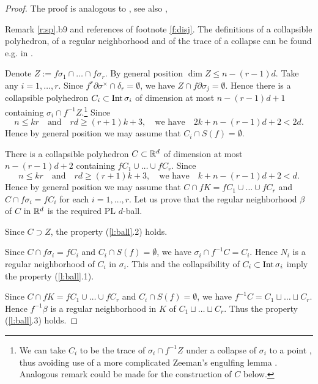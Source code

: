 \documentclass[12pt]{article}
\newcommand{\jonly}[1]{}
\newcommand{\aronly}[1]{#1}
\def\diag{\delta}
\def\Int{\mathop{\fam0 Int}}
\theoremstyle{plain}
\theoremstyle{definition}
\begin{document}
\begin{proof}
The proof is analogous to \cite[\S5]{We67}, see also \cite[Lemma 8]{MW16},
\jonly{\cite[Remark 6.1.b9]{Sk17} and references of \cite[footnote 6]{Sk17}.}
\aronly{Remark \ref{r:sp}.b9 and references of footnote \ref{f:disj}.}
The definitions of a collapsible polyhedron, of a regular neighborhood and of the trace of a collapse can be found e.g. in \cite[\S8.3]{Sk06}.

Denote $Z:=f\sigma_1\cap\ldots\cap f\sigma_r$.
By general position $\dim Z\le n-(r-1)d$.
Take any $i=1,\ldots,r$.
Since $f^r\partial\sigma^\times\cap\diag_r=\emptyset$, we have $Z\cap f\partial\sigma_j=\emptyset$.
Hence there is a collapsible polyhedron $C_i\subset\Int\sigma_i$ of dimension at most $n-(r-1)d+1$ containing $\sigma_i\cap f^{-1}Z$.\aronly{\footnote{We can take $C_i$ to be the trace of $\sigma_i\cap f^{-1}Z$ under a collapse of $\sigma_i$ to a point \cite[\S8.4]{Sk06}, thus avoiding use of a more complicated Zeeman's engulfing lemma \cite[Lemma 7]{MW16}. Analogous remark could be made for the construction of $C$ below.}}
Since
$$n\le kr\quad\text{and}\quad rd\ge(r+1)k+3,\quad\text{we have}\quad 2k+n-(r-1)d+2<2d.$$
Hence by general position we may assume that $C_i\cap S(f)=\emptyset$.

There is a collapsible polyhedron $C\subset{\mathbb R}^d$ of dimension at most $n-(r-1)d+2$ containing
$fC_1\cup \ldots\cup fC_r$.
Since
$$n\le kr\quad\text{and}\quad rd\ge(r+1)k+3,\quad\text{we have}\quad k+n-(r-1)d+2<d.$$
Hence by general position we may assume that $C\cap fK=fC_1\cup\ldots\cup fC_r$ and $C\cap f\sigma_i=fC_i$ for each $i=1,\ldots,r$.
Let us prove that the regular neighborhood $\beta$ of $C$ in ${\mathbb R}^d$ is the required PL $d$-ball.


Since $C\supset Z$, the property (\ref{l:ball}.2) holds.

Since $C\cap f\sigma_i=fC_i$ and $C_i\cap S(f)=\emptyset$, we have $\sigma_i\cap f^{-1}C=C_i$.
Hence $N_i$ is a regular neighborhood of $C_i$ in $\sigma_i$.
This and the collapsibility of $C_i\subset\Int\sigma_i$ imply the property (\ref{l:ball}.1).


Since $C\cap fK=fC_1\cup\ldots\cup fC_r$ and $C_i\cap S(f)=\emptyset$, we have
$f^{-1}C=C_1\sqcup\ldots\sqcup C_r$.
Hence $f^{-1}\beta$ is a regular neighborhood in $K$ of $C_1\sqcup\ldots\sqcup C_r$.
Thus the property (\ref{l:ball}.3) holds.
\end{proof}
\end{document}
